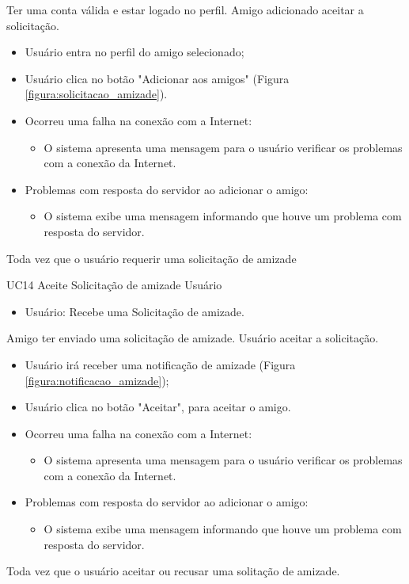 {Ter uma conta válida e estar logado no perfil.}
{Amigo adicionado aceitar a solicitação.}
{
\begin{itemize}
		\item Usuário entra no perfil do amigo selecionado;
		\item Usuário clica no botão "Adicionar aos amigos" (Figura \ref{figura:solicitacao_amizade}).	
\end{itemize}
}
{
\begin{itemize}
	\item Ocorreu uma falha na conexão com a Internet:
	\begin{itemize}
		\item O sistema apresenta uma mensagem para o usuário verificar os problemas com a conexão da Internet.
	\end{itemize}
	
	\item Problemas com resposta do servidor ao adicionar o amigo:
	\begin{itemize}
	\item O sistema exibe uma mensagem informando que houve um problema com resposta do servidor.
	\end{itemize}

\end{itemize}
}
{Toda vez que o usuário requerir uma solicitação de amizade}
{
 
}
\casoDeUso
{UC14}
{Aceite Solicitação de amizade}
{Usuário}
{
\begin{itemize}
	\item Usuário: Recebe uma Solicitação de amizade.
\end{itemize}

}
{Amigo ter enviado uma solicitação de amizade.}
{Usuário aceitar a solicitação.}
{
\begin{itemize}
		\item Usuário irá receber uma notificação de amizade (Figura \ref{figura:notificacao_amizade});
		\item Usuário clica no botão "Aceitar", para aceitar o amigo.
\end{itemize}
}
{
\begin{itemize}
	\item Ocorreu uma falha na conexão com a Internet:
	\begin{itemize}
		\item O sistema apresenta uma mensagem para o usuário verificar os problemas com a conexão da Internet.
	\end{itemize}
	
	\item Problemas com resposta do servidor ao adicionar o amigo:
	\begin{itemize}
	\item O sistema exibe uma mensagem informando que houve um problema com resposta do servidor.
	\end{itemize}

\end{itemize}
}
{Toda vez que o usuário aceitar ou recusar uma solitação de amizade.}
{
 
}

